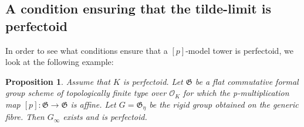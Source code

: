 \documentclass[10pt,oneside]{amsart}
\newtheorem{proposition}[theorem]{Proposition}
\theoremstyle{definition}
\theoremstyle{remark}
\begin{document}
	\subsection{A condition ensuring that the tilde-limit is perfectoid}
	In order to see what conditions ensure that a $[p]$-model tower is perfectoid, we look at the following example:
	\begin{proposition}\label{limit exists and is perfectoid: commutative formal group case}
		Assume that $K$ is perfectoid. Let $\mathfrak G$ be a flat commutative formal group scheme of topologically finite type over $\mathcal O_K$ for which the p-multiplication map $[p]:\mathfrak G\rightarrow \mathfrak G$ is affine. Let $G = \mathfrak G_\eta$ be the rigid group obtained on the generic fibre. Then $G_\infty$ exists and is perfectoid.
	\end{proposition}
\end{document}
